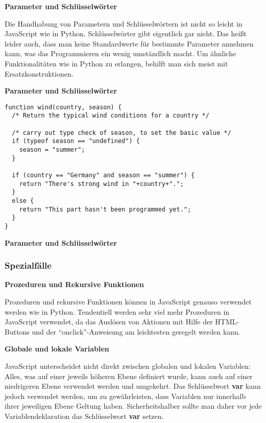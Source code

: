 \par\noindent\textbf{Parameter und Schlüsselwörter}

Die Handhabung von Parametern und Schlüsselwörtern ist nicht so leicht
in JavaScript wie in Python. Schlüsselwörter gibt eigentlich gar nicht.
Das heißt leider auch, dass man keine Standardwerte für bestimmte
Parameter annehmen kann, was das Programmieren ein wenig umständlich
macht. Um ähnliche Funktionalitäten wie in Python zu erlangen, behilft
man sich meist mit Ersatzkonstruktionen.




\par\noindent\textbf{Parameter und Schlüsselwörter}

\begin{verbatim}
function wind(country, season) {
  /* Return the typical wind conditions for a country */

  /* carry out type check of season, to set the basic value */
  if (typeof season == "undefined") {
    season = "summer";
  }

  if (country == "Germany" and season == "summer") {
    return "There's strong wind in "+country+".";
  }
  else {
    return "This part hasn't been programmed yet.";
  }
}
\end{verbatim}




\par\noindent\textbf{Parameter und Schlüsselwörter}



\subsubsection{\texorpdfstring{{Spezialfälle}}{Spezialfälle}}

\par\noindent\textbf{Prozeduren und Rekursive Funktionen}

Prozeduren und rekursive Funktionen können in JavaScript genauso
verwendet werden wie in Python. Tendentiell werden sehr viel mehr
Prozeduren in JavaScript verwendet, da das Auslösen von Aktionen mit
Hilfe der HTML-Buttons und der ``onclick''-Anweisung am leichtesten
geregelt werden kann.




\par\noindent\textbf{Globale und lokale Variablen}

JavaScript unterscheidet nicht direkt zwischen globalen und lokalen
Variablen: Alles, was auf einer jeweils höheren Ebene definiert wurde,
kann auch auf einer niedrigeren Ebene verwendet werden und umgekehrt.
Das Schlüsselwort \textbf{var} kann jedoch verwendet werden, um zu
gewährleisten, dass Variablen nur innerhalb ihrer jeweiligen Ebene
Geltung haben. Sicherheitshalber sollte man daher vor jede
Variablendeklaration das Schlüsselwort \textbf{var} setzen.





